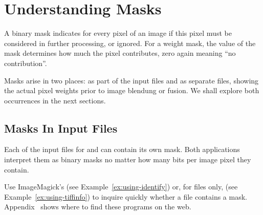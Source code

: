 

\chapter[Understanding Masks\commonpart]{Understanding Masks\commonpart
  \label{sec:understanding-masks}
  }

A binary mask
indicates for every pixel of an image if this pixel must be considered
in further processing, or ignored.  For a weight
mask, the value of the mask determines how much
the pixel contributes, zero again meaning ``no contribution''.

Masks arise in two places: as part of the input files and as separate
files, showing the actual pixel weights prior to image blendung or
fusion.  We shall explore both occurrences in the next sections.


\section[Masks In Input Files]{Masks In Input Files
  \label{sec:masks-in-input-files}
  }

Each of the input files for  and
 can contain its own mask.  Both applications
interpret them as binary masks no matter how many bits per image pixel
they contain.

Use ImageMagick's  (see Example~\ref{ex:using-identify}) or,
for  files only,  (see Example~\ref{ex:using-tiffinfo}) to inquire
quickly whether a file contains a mask.
Appendix~ shows where to find these
programs on the web.

